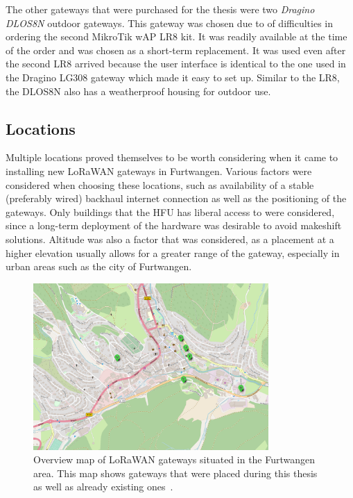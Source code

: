 The other gateways that were purchased for the thesis were two \emph{Dragino DLOS8N} outdoor gateways.
This gateway was chosen due to of difficulties in ordering the second MikroTik wAP LR8 kit.
It was readily available at the time of the order and was chosen as a short-term replacement.
It was used even after the second LR8 arrived because the user interface is identical to the one used in the Dragino LG308 gateway which made it easy to set up.
Similar to the LR8, the DLOS8N also has a weatherproof housing for outdoor use.

\subsection{Locations}\label{sec:gateway-locations}

Multiple locations proved themselves to be worth considering when it came to installing new \ac{LoRaWAN} gateways in Furtwangen.
Various factors were considered when choosing these locations, such as availability of a stable (preferably wired) backhaul internet connection as well as the positioning of the gateways.
Only buildings that the \ac{HFU} has liberal access to were considered, since a long-term deployment of the hardware was desirable to avoid makeshift solutions.
Altitude was also a factor that was considered, as a placement at a higher elevation usually allows for a greater range of the gateway, especially in urban areas such as the city of Furtwangen.

\begin{figure}[htbp]
    \centering
    \includegraphics[width=0.8\textwidth]{pictures/hardware/gateway-deployment/gateway_deployment_map.png}
    \caption{
        Overview map of \ac{LoRaWAN} gateways situated in the Furtwangen area.
        This map shows gateways that were placed during this thesis as well as already existing ones~\cite{ttn_mapper_ttn_2023}.
    }\label{pic:gateways-placement-map}
\end{figure}

